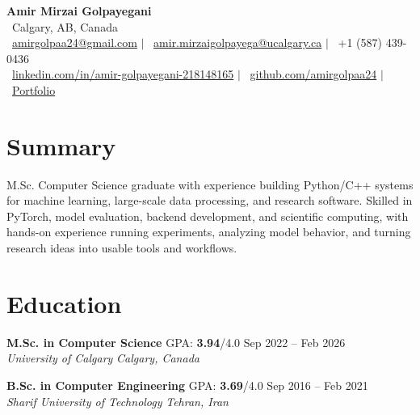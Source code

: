 \documentclass[a4paper,10pt]{article}
\newcommand{\resumeEducationSubheading}[5]{
    \textbf{#1} \hfill #2 \hfill #3 \\
    \textit{#4} \hfill \textit{#5}
}
\begin{document}

\begin{center}
    {\LARGE \textbf{Amir Mirzai Golpayegani}} \\[0.25em]
    \faMapMarker*~Calgary, AB, Canada \\[0.25em]
    \faEnvelope~\href{mailto:amirgolpaa24@gmail.com}{amirgolpaa24@gmail.com}
    $|$
    \faEnvelope~\href{mailto:amir.mirzaigolpayega@ucalgary.ca}{amir.mirzaigolpayega@ucalgary.ca}
    $|$
    \faPhone*~+1 (587) 439-0436 \\[0.25em]
    \faLinkedin~\href{https://linkedin.com/in/amir-golpayegani-218148165}{linkedin.com/in/amir-golpayegani-218148165}
    $|$
    \faGithub~\href{https://github.com/amirgolpaa24}{github.com/amirgolpaa24}
    $|$
    \faGlobe~\href{https://amir-portfolio-navy.vercel.app/}{Portfolio}
\end{center}


\section*{Summary}

M.Sc. Computer Science graduate with experience building Python/C++ systems for machine learning, large-scale data processing, and research software. Skilled in PyTorch, model evaluation, backend development, and scientific computing, with hands-on experience running experiments, analyzing model behavior, and turning research ideas into usable tools and workflows.


\section*{Education}

\resumeEducationSubheading
{M.Sc. in Computer Science}
{GPA: \textbf{3.94}/4.0}
{Sep 2022 -- Feb 2026}
{University of Calgary}
{Calgary, Canada}

\vspace{0.35em}

\resumeEducationSubheading
{B.Sc. in Computer Engineering}
{GPA: \textbf{3.69}/4.0}
{Sep 2016 -- Feb 2021}
{Sharif University of Technology}
{Tehran, Iran}

\end{document}
